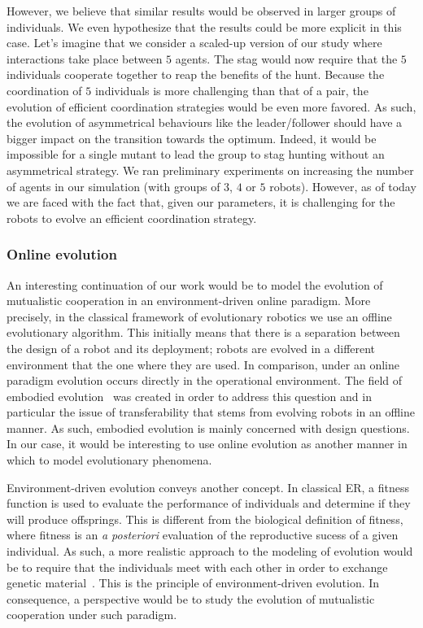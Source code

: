 			However, we believe that similar results would be observed in larger groups of individuals. We even hypothesize that the results could be more explicit in this case. Let's imagine that we consider a scaled-up version of our study where interactions take place between $5$ agents. The stag would now require that the $5$ individuals cooperate together to reap the benefits of the hunt. Because the coordination of $5$ individuals is more challenging than that of a pair, the evolution of efficient coordination strategies would be even more favored. As such, the evolution of asymmetrical behaviours like the leader/follower should have a bigger impact on the transition towards the optimum. Indeed, it would be impossible for a single mutant to lead the group to stag hunting without an asymmetrical strategy. We ran preliminary experiments on increasing the number of agents in our simulation (with groups of $3$, $4$ or $5$ robots). However, as of today we are faced with the fact that, given our parameters, it is challenging for the robots to evolve an efficient coordination strategy.


		\subsubsection{Online evolution}

			An interesting continuation of our work would be to model the evolution of mutualistic cooperation in an environment-driven online paradigm. More precisely, in the classical framework of evolutionary robotics we use an offline evolutionary algorithm. This initially means that there is a separation between the design of a robot and its deployment; robots are evolved in a different environment that the one where they are used. In comparison, under an online paradigm evolution occurs directly in the operational environment. The field of embodied evolution~\parencite{Watson2002} was created in order to address this question and in particular the issue of transferability that stems from evolving robots in an offline manner. As such, embodied evolution is mainly concerned with design questions. In our case, it would be interesting to use online evolution as another manner in which to model evolutionary phenomena. 

			Environment-driven evolution conveys another concept. In classical ER, a fitness function is used to evaluate the performance of individuals and determine if they will produce offsprings. This is different from the biological definition of fitness, where fitness is an \emph{a posteriori} evaluation of the reproductive sucess of a given individual. As such, a more realistic approach to the modeling of evolution would be to require that the individuals meet with each other in order to exchange genetic material~\parencite{Bredeche2010}. This is the principle of environment-driven evolution. In consequence, a perspective would be to study the evolution of mutualistic cooperation under such paradigm.

